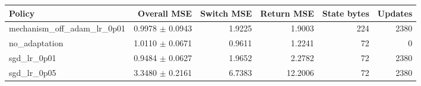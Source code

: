 \begin{tabular}{lrrrrr}
\hline
Policy & Overall MSE & Switch MSE & Return MSE & State bytes & Updates \\
\hline
mechanism\_off\_adam\_lr\_0p01 & 0.9978 $\pm$ 0.0943 & 1.9225 & 1.9003 & 224 & 2380 \\
no\_adaptation & 1.0110 $\pm$ 0.0671 & 0.9611 & 1.2241 & 72 & 0 \\
sgd\_lr\_0p01 & 0.9484 $\pm$ 0.0627 & 1.9652 & 2.2782 & 72 & 2380 \\
sgd\_lr\_0p05 & 3.3480 $\pm$ 0.2161 & 6.7383 & 12.2006 & 72 & 2380 \\
\hline
\end{tabular}
